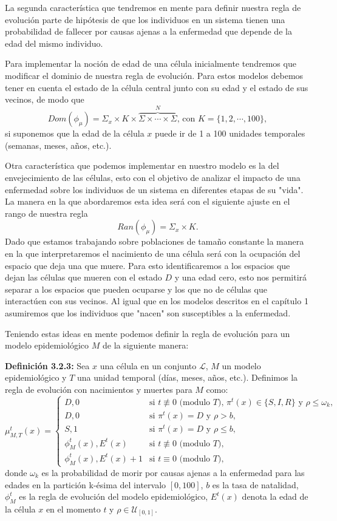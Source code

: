 La segunda característica que tendremos en mente para definir nuestra regla de evolución parte de hipótesis de que los individuos en un sistema tienen una probabilidad de fallecer por causas ajenas a la enfermedad que depende de la edad del mismo individuo.

Para implementar la noción de edad de una célula inicialmente tendremos que modificar el dominio de nuestra regla de evolución. Para estos modelos debemos tener en cuenta el estado de la célula central junto con su edad y el estado de sus vecinos, de modo que 
$$Dom(\phi_\mu)=\Sigma_x\times K\times\overbrace{\Sigma\times\cdots\times\Sigma}^N\text{, con }K=\{1,2,\cdots,100\},$$
si suponemos que la edad de la célula $x$ puede ir de 1 a 100 unidades temporales (semanas, meses, años, etc.).

Otra característica que podemos implementar en nuestro modelo es la del envejecimiento de las células, esto con el objetivo de analizar el impacto de una enfermedad sobre los individuos de un sistema en diferentes etapas de su "vida". La manera en la que abordaremos esta idea será con el siguiente ajuste en el rango de nuestra regla
$$Ran(\phi_\mu)=\Sigma_x\times K.$$
Dado que estamos trabajando sobre poblaciones de tamaño constante la manera en la que interpretaremos el nacimiento de una célula será con la ocupación del espacio que deja una que muere. Para esto identificaremos a los espacios que dejan las células que mueren con el estado $D$ y una edad cero, esto nos permitirá separar a los espacios que pueden ocuparse y los que no de células que interactúen con sus vecinos. Al igual que en los modelos descritos en el capítulo 1 asumiremos que los individuos que "nacen" son susceptibles a la enfermedad.

Teniendo estas ideas en mente podemos definir la regla de evolución para un modelo epidemiológico $M$ de la siguiente manera:

\textbf{Definición 3.2.3:} Sea $x$ una célula en un conjunto $\mathcal{L}$, $M$ un modelo epidemiológico y $T$ una unidad temporal (días, meses, años, etc.). Definimos la regla de evolución con nacimientos y muertes para $M$ como:
\begin{equation}
    \mu_{M,T}^t(x)=\left\{\begin{array}{ll}
        D,0 & \text{si }t\not\equiv 0 \text{ (modulo }T\text{), }\pi^t(x)\in\{S,I,R\}\text{ y }\rho\leq\omega_k, \\
        D,0 & \text{si }\pi^t(x)=D\text{ y }\rho>b,\\
        S,1 & \text{si }\pi^t(x)=D\text{ y }\rho\leq b,\\
        \phi_M^t(x),E^t(x) & \text{si }t\not\equiv 0 \text{ (modulo }T),\\
        \phi_M^t(x),E^t(x)+1 & \text{si }t\equiv 0 \text{ (modulo }T),
    \end{array}\right.
\end{equation}
donde $\omega_k$ es la probabilidad de morir por causas ajenas a la enfermedad para las edades en la partición k-ésima del intervalo $[0,100]$, $b$ es la tasa de natalidad, $\phi_M^t$ es la regla de evolución del modelo epidemiológico, $E^t(x)$ denota la edad de la célula $x$ en el momento $t$ y $\rho\in\mathcal{U}_{[0,1]}$.
